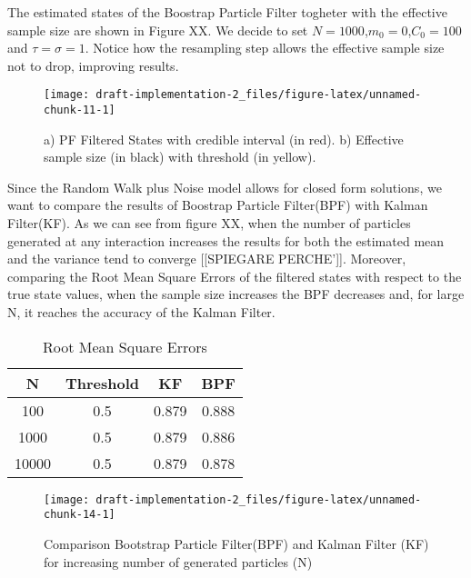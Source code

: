 \documentclass[
]{article}
\begin{document}
The estimated states of the Boostrap Particle Filter togheter with the
effective sample size are shown in Figure XX. We decide to set
\(N=1000\),\(m_{0}=0\),\(C_{0}=100\) and \(\tau=\sigma=1\). Notice how
the resampling step allows the effective sample size not to drop,
improving results.

\begin{figure}[ht]

{\centering \texttt{[image: draft-implementation-2\_files/figure-latex/unnamed-chunk-11-1]} 

}

\caption{a) PF Filtered States with credible interval (in red). b) Effective sample size (in black) with threshold (in yellow).}\label{fig:unnamed-chunk-11}
\end{figure}

Since the Random Walk plus Noise model allows for closed form solutions,
we want to compare the results of Boostrap Particle Filter(BPF) with
Kalman Filter(KF). As we can see from figure XX, when the number of
particles generated at any interaction increases the results for both
the estimated mean and the variance tend to converge {[}{[}SPIEGARE
PERCHE'{]}{]}. Moreover, comparing the Root Mean Square Errors of the
filtered states with respect to the true state values, when the sample
size increases the BPF decreases and, for large N, it reaches the
accuracy of the Kalman Filter.

\begin{longtable}[t]{cccc}
\caption{\label{tab:unnamed-chunk-13}Root Mean Square Errors}\\
\toprule
N & Threshold & KF & BPF\\
\midrule
100 & 0.5 & 0.879 & 0.888\\
1000 & 0.5 & 0.879 & 0.886\\
10000 & 0.5 & 0.879 & 0.878\\
\bottomrule
\end{longtable}

\begin{figure}[ht]

{\centering \texttt{[image: draft-implementation-2\_files/figure-latex/unnamed-chunk-14-1]} 

}

\caption{Comparison Bootstrap Particle Filter(BPF) and Kalman Filter (KF) for increasing number of generated particles (N)}\label{fig:unnamed-chunk-14}
\end{figure}

\hfill\break
\end{document}
